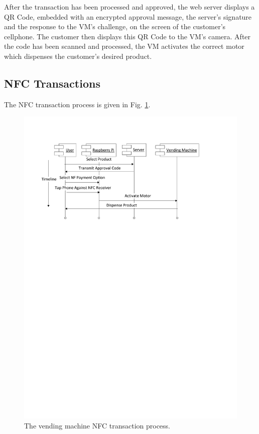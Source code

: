 After the transaction has been processed and approved, the web server displays a
QR Code, embedded with an encrypted approval message, the server's signature
and the response to the VM's challenge, on the screen of the customer's cellphone. The
customer then displays this QR Code to the VM's camera. After the code has
been scanned and processed, the VM activates the correct motor which
dispenses the customer's desired product.

\subsection{NFC Transactions}

The NFC transaction process is given in Fig. \ref{fig:vm_nfc_interaction}.

\begin{figure}
 \centering 
 \includegraphics[clip=true, trim = 0 550 40 70, scale=0.7]{nfc_transaction_processflow}
 \caption{The vending machine NFC transaction process.}
 \label{fig:vm_nfc_interaction}
\end{figure}

